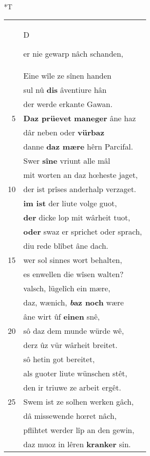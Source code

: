 \documentclass[8pt,a4paper,notitlepage]{article}
\begin{document}
\begin{table}[ht]
\begin{minipage}[t]{0.5\linewidth}
\end{minipage}
\hspace{0.5cm}
\begin{minipage}[t]{0.5\linewidth}
\small
\begin{center}*T
\end{center}
\begin{tabular}{rl}
 & \begin{large}D\end{large}er nie gewarp nâch schanden,\\ 
 & Eine wîle ze sînen handen\\ 
 & sul nû \textbf{dis} âventiure hân\\ 
 & der werde erkante Gawan.\\ 
5 & \textbf{Daz prüevet} \textbf{maneger} âne haz\\ 
 & dâr neben oder \textbf{vürbaz}\\ 
 & danne \textbf{daz mære} hêrn Parcifal.\\ 
 & Swer \textbf{sîne} vriunt alle mâl\\ 
 & mit worten an daz hœheste jaget,\\ 
10 & der ist prîses anderhalp verzaget.\\ 
 & \textbf{im ist} der liute volge guot,\\ 
 & \textbf{der} dicke lop mit wârheit tuot,\\ 
 & \textbf{oder} swaz er sprichet oder sprach,\\ 
 & diu rede blîbet âne dach.\\ 
15 & wer sol sinnes wort behalten,\\ 
 & es enwellen die wîsen walten?\\ 
 & valsch, lügelîch ein mære,\\ 
 & daz, wænich, \textbf{\textit{b}az noch} wære\\ 
 & âne wirt ûf \textbf{einen} snê,\\ 
20 & sô daz dem munde würde wê,\\ 
 & derz ûz vür wârheit breitet.\\ 
 & sô hetin got bereitet,\\ 
 & als guoter liute wünschen stêt,\\ 
 & den ir triuwe ze arbeit ergêt.\\ 
25 & Swem ist ze solhen werken gâch,\\ 
 & dâ missewende hœret nâch,\\ 
 & pflihtet werder lîp an den gewin,\\ 
 & daz muoz in lêren \textbf{kranker} sin.\\ 

\end{tabular}
\end{minipage}
\end{table}
\end{document}
